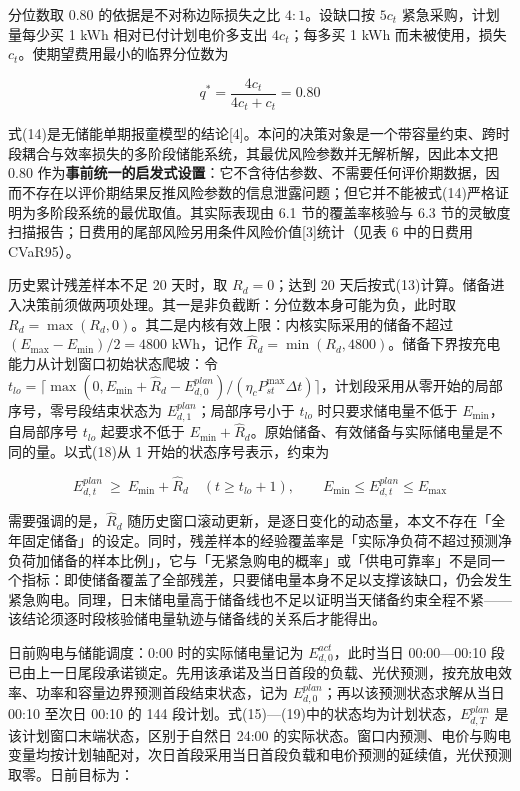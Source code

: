 \documentclass[12pt,a4paper]{ctexart}
\begin{document}
分位数取 0.80 的依据是不对称边际损失之比 $4:1$。设缺口按 $5c_t$ 紧急采购，计划量每少买 1 kWh 相对已付计划电价多支出 $4c_t$；每多买 1 kWh 而未被使用，损失 $c_t$。使期望费用最小的临界分位数为

\begin{equation}
q^{*}=\frac{4c_t}{4c_t+c_t}=0.80
\end{equation}

式(14)是无储能单期报童模型的结论[4]。本问的决策对象是一个带容量约束、跨时段耦合与效率损失的多阶段储能系统，其最优风险参数并无解析解，因此本文把 0.80 作为\textbf{事前统一的启发式设置}：它不含待估参数、不需要任何评价期数据，因而不存在以评价期结果反推风险参数的信息泄露问题；但它并不能被式(14)严格证明为多阶段系统的最优取值。其实际表现由 6.1 节的覆盖率核验与 6.3 节的灵敏度扫描报告；日费用的尾部风险另用条件风险价值[3]统计（见表 6 中的日费用 CVaR95）。

历史累计残差样本不足 20 天时，取 $R_d=0$；达到 20 天后按式(13)计算。储备进入决策前须做两项处理。其一是非负截断：分位数本身可能为负，此时取 $R_d=\max(R_d,0)$。其二是内核有效上限：内核实际采用的储备不超过 $(E_{\max}-E_{\min})/2=4800$ kWh，记作 $\widehat{R}_d=\min(R_d,4800)$。储备下界按充电能力从计划窗口初始状态爬坡：令 $t_{lo}=\lceil\max(0,E_{\min}+\widehat{R}_d-E^{plan}_{d,0})/(\eta_c P_{st}^{\max}\Delta t)\rceil$，计划段采用从零开始的局部序号，零号段结束状态为 $E^{plan}_{d,1}$；局部序号小于 $t_{lo}$ 时只要求储电量不低于 $E_{\min}$，自局部序号 $t_{lo}$ 起要求不低于 $E_{\min}+\widehat{R}_d$。原始储备、有效储备与实际储电量是不同的量。以式(18)从 1 开始的状态序号表示，约束为

\begin{equation}
E^{plan}_{d,t}\ \ge\ E_{\min}+\widehat{R}_d\quad(t\ge t_{lo}+1),\qquad E_{\min}\le E^{plan}_{d,t}\le E_{\max}
\end{equation}

需要强调的是，$\widehat{R}_d$ 随历史窗口滚动更新，是逐日变化的动态量，本文不存在「全年固定储备」的设定。同时，残差样本的经验覆盖率是「实际净负荷不超过预测净负荷加储备的样本比例」，它与「无紧急购电的概率」或「供电可靠率」不是同一个指标：即使储备覆盖了全部残差，只要储电量本身不足以支撑该缺口，仍会发生紧急购电。同理，日末储电量高于储备线也不足以证明当天储备约束全程不紧——该结论须逐时段核验储电量轨迹与储备线的关系后才能得出。

日前购电与储能调度：0:00 时的实际储电量记为 $E^{act}_{d,0}$，此时当日 00:00—00:10 段已由上一日尾段承诺锁定。先用该承诺及当日首段的负载、光伏预测，按充放电效率、功率和容量边界预测首段结束状态，记为 $E^{plan}_{d,0}$；再以该预测状态求解从当日 00:10 至次日 00:10 的 144 段计划。式(15)—(19)中的状态均为计划状态，$E^{plan}_{d,T}$ 是该计划窗口末端状态，区别于自然日 24:00 的实际状态。窗口内预测、电价与购电变量均按计划轴配对，次日首段采用当日首段负载和电价预测的延续值，光伏预测取零。日前目标为：
\end{document}
